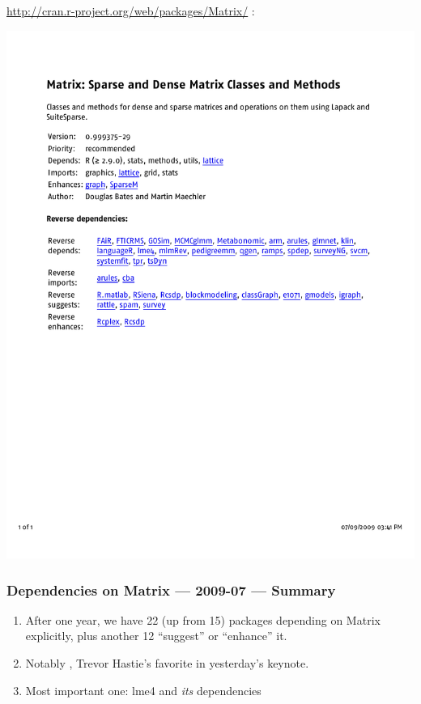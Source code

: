 \documentclass[dvipsnames,pdflatex,beamer]{beamer}
\begin{document}
\begin{frame}
 \url{http://cran.r-project.org/web/packages/Matrix/} :

 \includegraphics[width=1.\textwidth,viewport=40 0 580 730,clip]{figs/Matrix-CRAN-depend-2}

\end{frame}

\begin{frame}\frametitle{Dependencies on Matrix --- 2009-07 --- Summary}

  \begin{enumerate}
  \item After one year, we have 22 (up from 15) packages depending on Matrix
    explicitly, plus another 12  ``suggest'' or ``enhance'' it.

  \item Notably , Trevor Hastie's favorite in yesterday's keynote.

  \item Most important one: \pause \alert{lme4} and \emph{its} dependencies
  \end{enumerate}

\end{frame}
\end{document}
